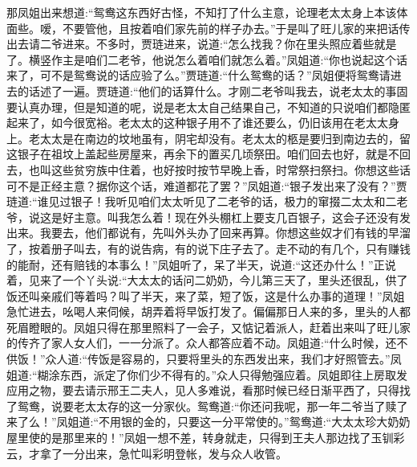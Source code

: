 \begin{parag}
    那凤姐出来想道:“鸳鸯这东西好古怪，不知打了什么主意，论理老太太身上本该体面些。嗳，不要管他，且按着咱们家先前的样子办去。”于是叫了旺儿家的来把话传出去请二爷进来。不多时，贾琏进来，说道:“怎么找我？你在里头照应着些就是了。横竖作主是咱们二老爷，他说怎么着咱们就怎么着。”凤姐道:“你也说起这个话来了，可不是鸳鸯说的话应验了么。”贾琏道:“什么鸳鸯的话？”凤姐便将鸳鸯请进去的话述了一遍。贾琏道:“他们的话算什么。才刚二老爷叫我去，说老太太的事固要认真办理，但是知道的呢，说是老太太自己结果自己，不知道的只说咱们都隐匿起来了，如今很宽裕。老太太的这种银子用不了谁还要么，仍旧该用在老太太身上。老太太是在南边的坟地虽有，阴宅却没有。老太太的柩是要归到南边去的，留这银子在祖坟上盖起些房屋来，再余下的置买几顷祭田。咱们回去也好，就是不回去，也叫这些贫穷族中住着，也好按时按节早晚上香，时常祭扫祭扫。你想这些话可不是正经主意？据你这个话，难道都花了罢？”凤姐道:“银子发出来了没有？”贾琏道:“谁见过银子！我听见咱们太太听见了二老爷的话，极力的窜掇二太太和二老爷，说这是好主意。叫我怎么着！现在外头棚杠上要支几百银子，这会子还没有发出来。我要去，他们都说有，先叫外头办了回来再算。你想这些奴才们有钱的早溜了，按着册子叫去，有的说告病，有的说下庄子去了。走不动的有几个，只有赚钱的能耐，还有赔钱的本事么！”凤姐听了，呆了半天，说道:“这还办什么！”正说着，见来了一个丫头说:“大太太的话问二奶奶，今儿第三天了，里头还很乱，供了饭还叫亲戚们等着吗？叫了半天，来了菜，短了饭，这是什么办事的道理！”凤姐急忙进去，吆喝人来伺候，胡弄着将早饭打发了。偏偏那日人来的多，里头的人都死眉瞪眼的。凤姐只得在那里照料了一会子，又惦记着派人，赶着出来叫了旺儿家的传齐了家人女人们，一一分派了。众人都答应着不动。凤姐道:“什么时候，还不供饭！”众人道:“传饭是容易的，只要将里头的东西发出来，我们才好照管去。”凤姐道:“糊涂东西，派定了你们少不得有的。”众人只得勉强应着。凤姐即往上房取发应用之物，要去请示邢王二夫人，见人多难说，看那时候已经日渐平西了，只得找了鸳鸯，说要老太太存的这一分家伙。鸳鸯道:“你还问我呢，那一年二爷当了赎了来了么！”凤姐道:“不用银的金的，只要这一分平常使的。”鸳鸯道:“大太太珍大奶奶屋里使的是那里来的！”凤姐一想不差，转身就走，只得到王夫人那边找了玉钏彩云，才拿了一分出来，急忙叫彩明登帐，发与众人收管。
\end{parag}



